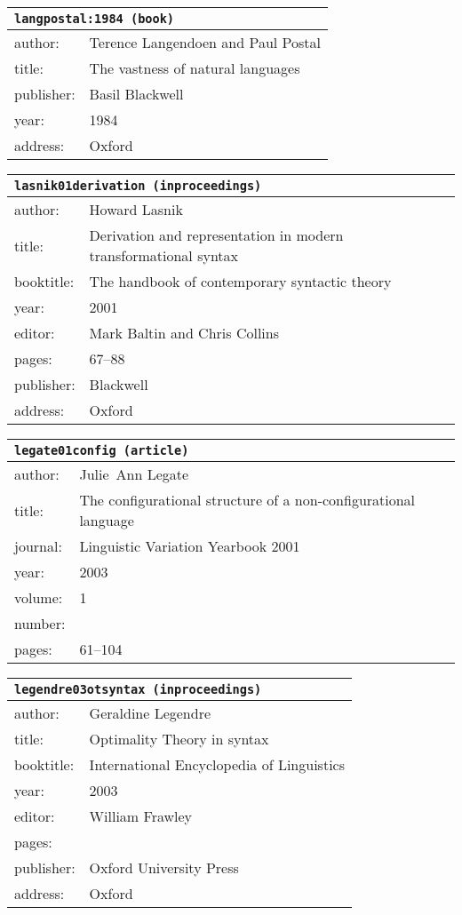 \documentclass{article}
\begin{document}
\begin{tabular}{p{}p{}}
\multicolumn{2}{l}{\texttt{langpostal:1984 (book)}}\\
\hline
author: & Terence Langendoen and Paul Postal\\
title: & The vastness of natural languages\\
publisher: & Basil Blackwell\\
year: & 1984\\
address: & Oxford\\
\end{tabular}

\bigskip

\begin{tabular}{p{}p{}}
\multicolumn{2}{l}{\texttt{lasnik01derivation (inproceedings)}}\\
\hline
author: & Howard Lasnik\\
title: & Derivation and representation in modern transformational syntax\\
booktitle: & The handbook of contemporary syntactic theory\\
year: & 2001\\
editor: & Mark Baltin and Chris Collins\\
pages: & 67--88\\
publisher: & Blackwell\\
address: & Oxford\\
\end{tabular}

\bigskip

\begin{tabular}{p{}p{}}
\multicolumn{2}{l}{\texttt{legate01config (article)}}\\
\hline
author: & Julie~Ann Legate\\
title: & The configurational structure of a non-configurational language\\
journal: & Linguistic Variation Yearbook 2001\\
year: & 2003\\
volume: & 1\\
number: & \\
pages: & 61--104\\
\end{tabular}

\bigskip

\begin{tabular}{p{}p{}}
\multicolumn{2}{l}{\texttt{legendre03otsyntax (inproceedings)}}\\
\hline
author: & Geraldine Legendre\\
title: & Optimality Theory in syntax\\
booktitle: & International Encyclopedia of Linguistics\\
year: & 2003\\
editor: & William Frawley\\
pages: & \\
publisher: & Oxford University Press\\
address: & Oxford\\
\end{tabular}
\end{document}
